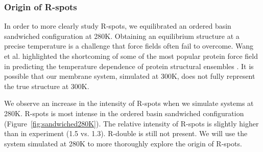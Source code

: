\documentclass[journal=jpcbfk,manusciprt=article]{achemso}
\begin{document}
%

  \subsubsection{Origin of R-spots}\label{section:rspots}

  In order to more clearly study R-spots, we equilibrated an ordered basin sandwiched 
  configuration at 280K. Obtaining an equilibrium structure at a precise temperature is
  a challenge that force fields often fail to overcome. Wang et al. highlighted the 
  shortcoming of some of the most popular protein force field in predicting the temperature
  dependence of protein structural ensembles \cite{wang_building_2017}. It is possible that   %
  our membrane system, simulated at 300K, does not fully represent the true structure at 300K.
  
  We observe an increase in the intensity of R-spots when we simulate systems at 280K. R-spots
  is most intense in the ordered basin sandwiched configuration (Figure~\ref{fig:sandwiched280K}). 
  The relative intensity of R-spots is slightly higher than in experiment (1.5 vs. 1.3). R-double 
  is still not present. We will use the system simulated at 280K to more thoroughly explore the 
  origin of R-spots.
  
\end{document}
